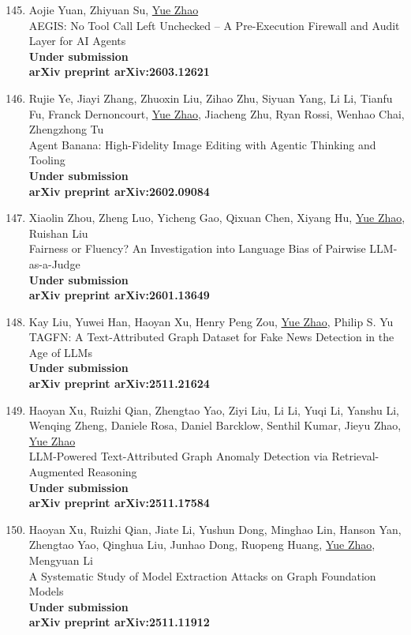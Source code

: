 \documentclass[margin,line,pifont,palatino,courier]{res}
\newenvironment{benumerate}[1]{
    \let\oldItem\item
    \def\item{\addtocounter{enumi}{-2}\oldItem}
    \begin{enumerate}[leftmargin=0.25in,label=\textcolor{uscred}{\arabic*.}]
    \setcounter{enumi}{#1}
    \addtocounter{enumi}{1}
}{
    \end{enumerate}
}
\begin{document}
\begin{resume}
\begin{benumerate}{144}
    \item
    Aojie Yuan, Zhiyuan Su, \underline{Yue Zhao}\\
    AEGIS: No Tool Call Left Unchecked -- A Pre-Execution Firewall and Audit Layer for AI Agents\\
    \textbf{Under submission}\\
    \textbf{arXiv preprint arXiv:2603.12621}

    \item
    Rujie Ye, Jiayi Zhang, Zhuoxin Liu, Zihao Zhu, Siyuan Yang, Li Li, Tianfu Fu, Franck Dernoncourt, \underline{Yue Zhao}, Jiacheng Zhu, Ryan Rossi, Wenhao Chai, Zhengzhong Tu\\
    Agent Banana: High-Fidelity Image Editing with Agentic Thinking and Tooling\\
    \textbf{Under submission}\\
    \textbf{arXiv preprint arXiv:2602.09084}


    \item
    Xiaolin Zhou, Zheng Luo, Yicheng Gao, Qixuan Chen, Xiyang Hu, \underline{Yue Zhao}, Ruishan Liu\\
    Fairness or Fluency? An Investigation into Language Bias of Pairwise LLM-as-a-Judge\\
    \textbf{Under submission}\\
    \textbf{arXiv preprint arXiv:2601.13649}


    \item 
    Kay Liu, Yuwei Han, Haoyan Xu, Henry Peng Zou, \underline{Yue Zhao}, Philip S. Yu \\
    TAGFN: A Text-Attributed Graph Dataset for Fake News Detection in the Age of LLMs \\
    \textbf{Under submission} \\
    \textbf{arXiv preprint arXiv:2511.21624}
    

    \item 
    Haoyan Xu, Ruizhi Qian, Zhengtao Yao, Ziyi Liu, Li Li, Yuqi Li, Yanshu Li, Wenqing Zheng, Daniele Rosa, Daniel Barcklow, Senthil Kumar, Jieyu Zhao, \underline{Yue Zhao} \\
    LLM-Powered Text-Attributed Graph Anomaly Detection via Retrieval-Augmented Reasoning \\
    \textbf{Under submission} \\
    \textbf{arXiv preprint arXiv:2511.17584}


    \item 
    Haoyan Xu, Ruizhi Qian, Jiate Li, Yushun Dong, Minghao Lin, Hanson Yan, Zhengtao Yao, Qinghua Liu, Junhao Dong, Ruopeng Huang, \underline{Yue Zhao}, Mengyuan Li \\
    A Systematic Study of Model Extraction Attacks on Graph Foundation Models \\
    \textbf{Under submission} \\
    \textbf{arXiv preprint arXiv:2511.11912}



\end{benumerate}
\end{resume}
\end{document}

